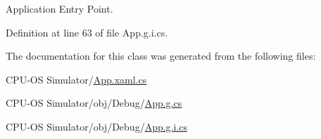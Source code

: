 Application Entry Point. 



Definition at line 63 of file App.\+g.\+i.\+cs.



The documentation for this class was generated from the following files\+:\begin{DoxyCompactItemize}
\item 
C\+P\+U-\/\+O\+S Simulator/\hyperlink{_c_p_u-_o_s_01_simulator_2_app_8xaml_8cs}{App.\+xaml.\+cs}\item 
C\+P\+U-\/\+O\+S Simulator/obj/\+Debug/\hyperlink{_c_p_u-_o_s_01_simulator_2obj_2_debug_2_app_8g_8cs}{App.\+g.\+cs}\item 
C\+P\+U-\/\+O\+S Simulator/obj/\+Debug/\hyperlink{_c_p_u-_o_s_01_simulator_2obj_2_debug_2_app_8g_8i_8cs}{App.\+g.\+i.\+cs}\end{DoxyCompactItemize}
